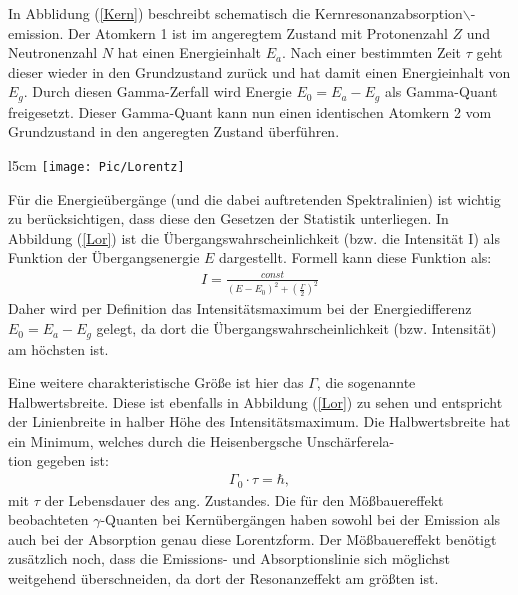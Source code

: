\documentclass[10pt,twoside]{article}
\renewcommand{\1}{^{-1}}
\renewcommand{\2}{^{-2}}
\newcommand{\3}{^{-3}}
\newcommand{\4}{^{-4}}
\newcommand{\5}{^{-5}}
\newcommand{\6}{^{-6}}
\newcommand{\7}{^{-7}}
\newcommand{\8}{^{-8}}
\newcommand{\9}{^{-9}}
\begin{document}
In Abblidung (\ref{Kern}) beschreibt schematisch die Kernresonanzabsorption$\backslash$-emission. 
Der Atomkern 1 ist im angeregtem Zustand mit Protonenzahl $Z$ und Neutronenzahl $N$ hat einen Energieinhalt ${E}_{{a}}$. 
Nach einer bestimmten Zeit $\tau$ geht dieser wieder in den Grundzustand zurück und hat damit einen Energieinhalt von ${E}_{{g}}$. 
Durch diesen Gamma-Zerfall wird Energie $E_0 = {E}_{{a}}- {E}_{{g}}$ als Gamma-Quant freigesetzt. 
Dieser Gamma-Quant kann nun einen identischen Atomkern 2 vom Grundzustand in den angeregten Zustand überführen.
\newpage 
\begin{minipage}[t]{\textwidth}
\begin{wrapfigure}{l}{5cm}
\vspace{-20pt}
\texttt{[image: Pic/Lorentz]}
\caption{Intensität-Übergangsenergie-Diagramm für Kernübergänge${^{\cite{1}}}$}
\label{Lor}
\end{wrapfigure}
Für die Energieübergänge (und die dabei auftretenden Spektralinien) ist wichtig zu berücksichtigen,
dass diese den Gesetzen der Statistik unterliegen.
In Abbildung (\ref{Lor}) ist die Übergangswahrscheinlichkeit (bzw. die Intensität I) als Funktion der Übergangsenergie $E$ dargestellt.
Formell kann diese Funktion als:
\begin{align*}
I=\frac{const}{({E}-{E}_0)^2 + (\frac{\Gamma}{2})^2}
\end{align*}
Daher wird per Definition das Intensitätsmaximum  bei der Energiedifferenz 
${E}_0 = {E}_a - {E}_g$ gelegt, da dort die Übergangswahrscheinlichkeit (bzw. Intensität) am höchsten ist.
\end{minipage} 

Eine weitere charakteristische Größe ist hier das $\Gamma$, die sogenannte Halbwertsbreite. Diese ist ebenfalls in Abbildung (\ref{Lor}) zu sehen und entspricht der Linienbreite in halber Höhe des Intensitätsmaximum. 
Die Halbwertsbreite hat ein Minimum, welches durch die Heisenbergsche Unschärferela-\\ tion gegeben ist:
\begin{align*}
\Gamma_0\cdot\tau = \hbar{,}
\end{align*}
mit $\tau$ der Lebensdauer des ang. Zustandes. 
Die für den Mößbauereffekt beobachteten $\gamma$-Quanten bei Kernübergängen haben sowohl bei der Emission als auch bei der Absorption genau diese Lorentzform. Der Mößbauereffekt benötigt zusätzlich noch, dass die Emissions- und Absorptionslinie sich möglichst weitgehend überschneiden, da dort der Resonanzeffekt am größten ist. \par
\end{document}
